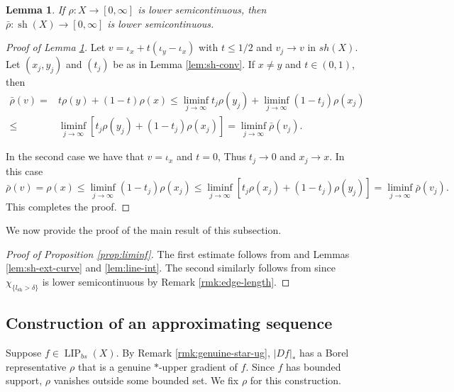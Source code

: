 \documentclass{amsart}
\newtheorem{lemma}[theorem]{Lemma}
\numberwithin{equation}{section}
\newcommand{\LIP}{\operatorname{LIP}}
\newcommand{\sh}{\operatorname{sh}}
\begin{document}
\begin{lemma}\label{lem:sh-ext-lsc}
    If $\rho:X\to [0,\infty]$ is lower semicontinuous, then $\bar\rho:\sh(X)\to [0,\infty]$ is lower semicontinuous.
\end{lemma}




\begin{proof}[Proof of Lemma \ref{lem:sh-ext-lsc}]
    Let $v=\iota_{x}+t(\iota_{y}-\iota_{x})$ with $t\le 1/2$ and $v_j\to v$ in $sh(X)$. Let $(x_j,y_j)$ and $(t_j)$ be as in Lemma \ref{lem:sh-conv}. If $x\ne y$ and $t\in (0,1)$, then
    \begin{align*}
\bar\rho(v)=&t\rho(y)+(1-t)\rho(x)\le \liminf_{j\to\infty} t_j\rho(y_j)+\liminf_{j\to\infty}(1-t_j)\rho(x_j)\\
\le & \liminf_{j\to\infty}[t_j\rho(y_j)+(1-t_j)\rho(x_j)]= \liminf_{j\to\infty}\bar\rho(v_j).
    \end{align*}

In the second case we have that $v=\iota_x$ and $t=0$, Thus $t_j\to 0$ and $x_j\to x$. In this case
\[
\bar\rho(v)=\rho(x)\le \liminf_{j\to\infty}(1-t_j)\rho(x_j)\le \liminf_{j\to\infty}[t_j\rho(x_j)+(1-t_j)\rho(y_j)]= \liminf_{j\to\infty}\bar\rho(v_j).
\]
This completes the proof.
\end{proof}



We now provide the proof of the main result of this subsection.


\begin{proof}[Proof of Proposition \ref{prop:liminf}]
The first estimate follows from \cite[Lemma 4.2]{davideb20} and Lemmas \ref{lem:sh-ext-curve} and \ref{lem:line-int}. The second similarly follows from \cite[Lemma 4.2]{davideb20} since $\chi_{\{l_{\sh}>\delta\}}$ is lower semicontinuous by Remark \ref{rmk:edge-length}.
\end{proof}

\subsection{Construction of an approximating sequence}

Suppose $f\in \LIP_{bs}(X)$. By Remark \ref{rmk:genuine-star-ug}, $|Df|_\ast$ has a Borel representative $\rho$ that is a genuine $\ast$-upper gradient of $f$. Since $f$ has bounded support, $\rho$ vanishes outside some bounded set. We fix $\rho$ for this construction.
 
\end{document}
